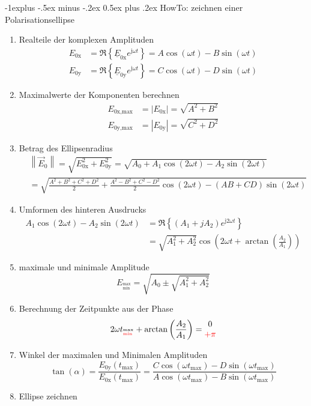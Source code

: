 \documentclass[10pt,a4paper,fleqn,landscape]{article}
\makeatletter
\renewcommand{\subsection}{\@startsection{subsection}{2}{0mm}%
                                {-1explus -.5ex minus -.2ex}%
                                {0.5ex plus .2ex}%
                                {\normalfont\normalsize\bfseries}}
\renewcommand{\c}[1]{\underline{#1}}			%
\renewcommand{\j}{{\mathrm j}}					%
\newcommand{\norm}[1]{\left\lVert#1\right\rVert}	%
\makeatother
\begin{document}
\begin{multicols}{2}
\subsection{HowTo: zeichnen einer Polarisationsellipse}
\begin{enumerate}
	\item Realteile der komplexen Amplituden
		\begin{align*}
			E_{0\text{x}}&=\Re{\left\{ \c{E}_{0\text{x}}e^{\j\omega t}\right\}} = A\cos(\omega t) - B\sin(\omega t) \\
			E_{0\text{y}}&=\Re{\left\{ \c{E}_{0\text{y}}e^{\j\omega t}\right\}} = C\cos(\omega t) - D\sin(\omega t)
		\end{align*}
	\item Maximalwerte der Komponenten berechnen
		\begin{align*}
			E_{0\text{x,max}}&=|E_{0\text{x}}|=\sqrt{A^2+B^2}\\
			E_{0\text{y,max}}&=|E_{0\text{y}}|=\sqrt{C^2+D^2}
		\end{align*}
	\item Betrag des Ellipsenradius
		\begin{align*}
			&\norm{\vec{E}_0}=\sqrt{E^2_{0\text{x}}+E^2_{0\text{y}}}=\sqrt{A_0+A_1\cos(2\omega t)-A_2\sin(2\omega t)}\\
			&=\sqrt{\frac{A^2+B^2+C^2+D^2}{2}+\frac{A^2-B^2+C^2-D^2}{2}\cos(2\omega t)-(AB+CD)\sin(2\omega t)}
		\end{align*}
	\item Umformen des hinteren Ausdrucks
		\begin{align*}
			A_1\cos(2\omega t)-A_2\sin(2\omega t)&=\Re\left\{(A_1+jA_2)e^{\j2\omega t}\right\}\\
			&=\sqrt{A_1^2+A_2^2}\cos\left(2\omega t+\arctan\left(\frac{A_2}{A_1}\right)\right)
		\end{align*}
	\item maximale und minimale Amplitude
		\begin{equation*}
			E_{^\text{max}_\text{min}}=\sqrt{A_0\pm\sqrt{A_1^2+A_2^2}}
		\end{equation*}
	\item Berechnung der Zeitpunkte aus der Phase
		\begin{equation*}
			2\omega t_{^\text{max}_\text{\textcolor{red}{min}}}+\arctan\left(\frac{A_2}{A_1}\right)=
			\begin{matrix}
				0\\
				\textcolor{red}{+\pi}
			\end{matrix}
		\end{equation*}
	\item Winkel der maximalen und Minimalen Amplituden
		\begin{equation*}
			\tan(\alpha)=\frac{E_{0\text{y}}\left(t_{\text{max}}\right)}{E_{0\text{x}}\left(t_{\text{max}}\right)}=\frac{C\cos\left(\omega t_{\text{max}}\right)-D\sin\left(\omega t_{\text{max}}\right)}{A\cos\left(\omega t_{\text{max}}\right)-B\sin\left(\omega t_{\text{max}}\right)}
		\end{equation*}
	\item Ellipse zeichnen


\end{enumerate}
\end{multicols}
\end{document}
